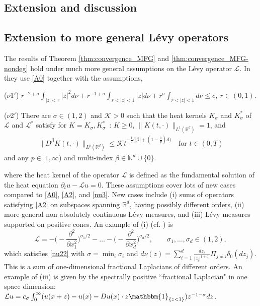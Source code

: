\documentclass[a4paper,  twoside, 10pt, leqno]{amsart}
\newcommand{\N}{\mathbb{N}}
\newcommand{\R}{\mathbb{R}}
\newcommand{\rd}{\mathbb{R}^d}
\theoremstyle{remark}
\theoremstyle{definition}
\newenvironment{description*}%
  {\begin{description}
    \setlength{\itemsep}{0.33em}
  }
  {\end{description}}
\begin{document}
\subsection{Extension and discussion}\label{subsec:ext}
\subsection*{Extension to more general L\'evy operators}

The results of Theorem \ref{thm:convergence_MFG} and \ref{thm:convergence_MFG-nondeg} 
hold under much more general assumptions on the L\'evy operator 
$\mathcal{L}$. 
In \cite{ersland2020classical} they use \ref{A0} together with the assumptions,
\begin{description*}
 \item[($\nu$1$'$)\label{nu22}]
                $ \displaystyle r^{-2+\sigma}\int_{|z|<r} |z|^2 d\nu + r^{-1+\sigma}\int_{r<|z|<1}
                |z| d\nu + r^{\sigma}\int_{r<|z|<1} d\nu\leq c
                 ,  \  r\in(0,1) $.
            \smallskip

 \item[($\nu$2$'$)\label{nu33}] There are $\sigma \in (1,2)$ and $\mathcal K
>0$ such that the heat kernels $K_\sigma$ and $K_\sigma^*$ of $\mathcal
L$ and $\mathcal L^*$ satisfy for $K=K_\sigma,K_\sigma^*$\ :
$K\geq0$, $\|K(t,\cdot)\|_{L^1(\R^d)}=1$, and 
        \begin{align*}
            \|D^{\beta} K
  (t,\cdot) \|_{L^p (\R^d)} \leq \mathcal K t^{-\frac{1}{\sigma}\big(|\beta|+(1-\frac1p)d\big)}\quad
            \text{for $t\in(0,T)$}
        \end{align*}
and any $p\in[1,\infty)$ and multi-index $\beta\in \N^{d}\cup \{0\}$.
\end{description*}

\medskip

\noindent where the heat kernel of the operator $\mathcal{L}$ is defined as the fundamental solution of the heat equation $\partial_{t} u - \mathcal{L} u = 0$.
These assumptions cover lots of new cases compared to \ref{A0}, \ref{A2}, and \ref{nu3}. 
New cases include (i) sums of operators satisfying 
\ref{A2} on subspaces spanning $\rd$, having possibly different orders, 
(ii) more general non-absolutely continuous L\'evy measures, 
and (iii) L\'evy measures supported on positive cones. 
An example of (i) (cf. \cite{ersland2020classical}) is
$$\mathcal L=-\Big(\!-\frac{\partial^2}{\partial
  x_1^2}\Big)^{\sigma_1/2}-\dots-\Big(\!-\frac{\partial^2}{\partial 
      x_d^2}\Big)^{\sigma_d/2}, \qquad \sigma_1,\dots,\sigma_d\in(1,2),$$
      which satisfies \ref{nu22} with $\sigma=\min_i\sigma_i$
   and $d\nu(z)= 
   \sum_{i=1}^d\frac{dz_i}{|z_i|^{1+\sigma_i}}\Pi_{j\neq
  i}\delta_0(dz_j)$. 
  This is a sum of one-dimensional fractional Laplacians of different orders.
  An example of (iii) is given by the spectrally positive ``fractional Laplacian" in one space dimension: 
  $\mathcal{L} u = c_{\sigma} \int_{0}^{\infty} ( u ( x+z ) - u ( x ) - Du ( x ) \cdot z \mathbbm{1}_{\{z < 1\}} ) z^{-1-\sigma} dz$.
\end{document}

